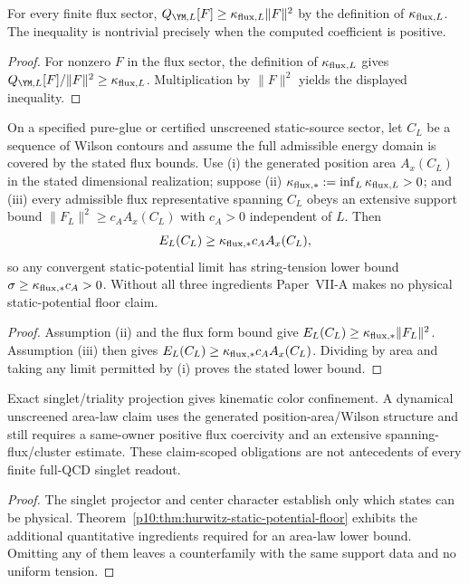 \documentclass[12pt,a4paper]{article}
\begin{document}
\begin{lemma}
\label{p10:lem:flux-sector-form-lower-bound}
For every finite flux sector, \(Q_{\YM,L}[F]\ge\kappa_{{\rm flux},L}\|F\|^2\) by the definition of \(\kappa_{{\rm flux},L}\).  The inequality is nontrivial precisely when the computed coefficient is positive.
\end{lemma}
\begin{proof}
For nonzero $F$ in the flux sector, the definition of $\kappa_{{\rm flux},L}$ gives $Q_{\YM,L}[F]/\|F\|^2\ge\kappa_{{\rm flux},L}$.  Multiplication by $\|F\|^2$ yields the displayed inequality.
\end{proof}

\begin{theorem}
\label{p10:thm:hurwitz-static-potential-floor}
On a specified pure-glue or certified unscreened static-source sector, let \(C_L\) be a sequence of Wilson contours and assume the full admissible energy domain is covered by the stated flux bounds.  Use (i) the generated position area \(A_x(C_L)\) in the stated dimensional realization; suppose (ii) \(\kappa_{\rm flux,*}:=\inf_L\kappa_{{\rm flux},L}>0\); and (iii) every admissible flux representative spanning \(C_L\) obeys an extensive support bound \(\|F_L\|^2\ge c_A A_x(C_L)\) with \(c_A>0\) independent of \(L\).  Then
\begin{equation}
E_L(C_L)\ge \kappa_{\rm flux,*}c_A A_x(C_L),
\end{equation}
so any convergent static-potential limit has string-tension lower bound \(\sigma\ge\kappa_{\rm flux,*}c_A>0\).  Without all three ingredients Paper~VII-A makes no physical static-potential floor claim.
\end{theorem}
\begin{proof}
Assumption (ii) and the flux form bound give $E_L(C_L)\ge\kappa_{\rm flux,*}\|F_L\|^2$.  Assumption (iii) then gives $E_L(C_L)\ge\kappa_{\rm flux,*}c_A A_x(C_L)$.  Dividing by area and taking any limit permitted by (i) proves the stated lower bound.
\end{proof}

\begin{corollary}
\label{p10:cor:no-strong-coupling-assumption-native-confinement}
Exact singlet/triality projection gives kinematic color confinement.  A dynamical unscreened area-law claim uses the generated position-area/Wilson structure and still requires a same-owner positive flux coercivity and an extensive spanning-flux/cluster estimate.  These claim-scoped obligations are not antecedents of every finite full-QCD singlet readout.
\end{corollary}
\begin{proof}
The singlet projector and center character establish only which states can be physical.  Theorem~\ref{p10:thm:hurwitz-static-potential-floor} exhibits the additional quantitative ingredients required for an area-law lower bound.  Omitting any of them leaves a counterfamily with the same support data and no uniform tension.
\end{proof}
\end{document}
